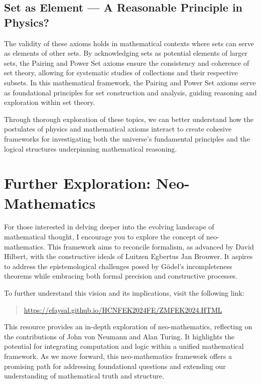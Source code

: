 \documentclass{article}
\begin{document}
\subsection{Set as Element — A Reasonable Principle in Physics?}

The validity of these axioms holds in mathematical contexts where sets can serve as elements of other sets. By acknowledging sets as potential elements of larger sets, the Pairing and Power Set axioms ensure the consistency and coherence of set theory, allowing for systematic studies of collections and their respective subsets. In this mathematical framework, the Pairing and Power Set axioms serve as foundational principles for set construction and analysis, guiding reasoning and exploration within set theory.

Through thorough exploration of these topics, we can better understand how the postulates of physics and mathematical axioms interact to create cohesive frameworks for investigating both the universe's fundamental principles and the logical structures underpinning mathematical reasoning.


\section*{Further Exploration: Neo-Mathematics}

For those interested in delving deeper into the evolving landscape of mathematical thought, I encourage you to explore the concept of neo-mathematics. This framework aims to reconcile formalism, as advanced by David Hilbert, with the constructive ideals of Luitzen Egbertus Jan Brouwer. It aspires to address the epistemological challenges posed by Gödel's incompleteness theorems while embracing both formal precision and constructive processes.

To further understand this vision and its implications, visit the following link:
\begin{quote}
\url{https://efaysal.github.io/HCNFEK2024FE/ZMFEK2024.HTML}
\end{quote}

This resource provides an in-depth exploration of neo-mathematics, reflecting on the contributions of John von Neumann and Alan Turing. It highlights the potential for integrating computation and logic within a unified mathematical framework. As we move forward, this neo-mathematics framework offers a promising path for addressing foundational questions and extending our understanding of mathematical truth and structure.
\end{document}

